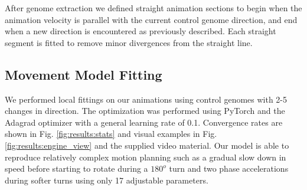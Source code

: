 After genome extraction we defined straight animation sections to begin when the animation velocity is parallel with the current control genome direction, and end when a new direction is encountered as previously described. Each straight segment is fitted to remove minor divergences from the straight line.


\subsection{Movement Model Fitting}
We performed local fittings on our animations using control genomes with 2-5 changes in direction. The optimization was performed using PyTorch and the Adagrad optimizer with a general learning rate of 0.1. Convergence rates are shown in Fig. \ref{fig:results:stats} and visual examples in Fig. \ref{fig:results:engine_view} and the supplied video material. Our model is able to reproduce relatively complex motion planning such as a gradual slow down in speed before starting to rotate during a $180^o$ turn and two phase accelerations during softer turns using only 17 adjustable parameters. 

